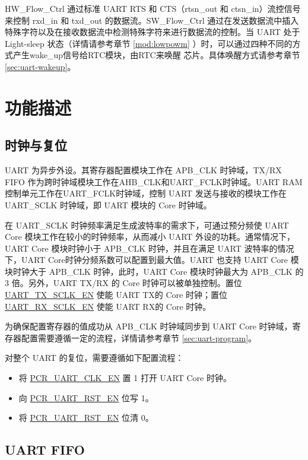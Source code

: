 \documentclass[main\_\_CN.tex]{subfiles}
\begin{document}
HW\_Flow\_Ctrl 通过标准 UART RTS 和 CTS（rtsn\_out 和 ctsn\_in）流控信号来控制 rxd\_in 和 txd\_out 的数据流。SW\_Flow\_Ctrl 通过在发送数据流中插入特殊字符以及在接收数据流中检测特殊字符来进行数据流的控制。当 UART 处于 Light-sleep 状态（详情请参考章节 \ref{mod:lowpowm} \textit{}）时，可以通过四种不同的方式产生wake\_up信号给RTC模块，由RTC来唤醒 \chipname{} 芯片。具体唤醒方式请参考章节 \ref{sec:uart-wakeup}。

\section{功能描述}

\subsection{时钟与复位}
UART 为异步外设。其寄存器配置模块工作在 APB\_CLK 时钟域，TX/RX FIFO 作为跨时钟域模块工作在AHB\_CLK和UART\_FCLK时钟域。UART RAM控制单元工作在UART\_FCLK时钟域，控制 UART 发送与接收的模块工作在 UART\_SCLK 时钟域，即 UART 模块的 Core 时钟域。

在 UART\_SCLK 时钟频率满足生成波特率的需求下，可通过预分频使 UART Core 模块工作在较小的时钟频率，从而减小 UART 外设的功耗。通常情况下，UART Core 模块时钟小于 APB\_CLK 时钟，并且在满足 UART 波特率的情况下，UART Core时钟分频系数可以配置到最大值。UART 也支持 UART Core 模块时钟大于 APB\_CLK 时钟，此时，UART Core 模块时钟最大为 APB\_CLK 的 3 倍。另外，UART TX/RX 的 Core 时钟可以被单独控制。置位 \hyperref[fielddesc:UARTTXSCLKEN]{UART\_TX\_SCLK\_EN} 使能 UART TX的 Core 时钟；置位 \hyperref[fielddesc:UARTRXSCLKEN]{UART\_RX\_SCLK\_EN} 使能 UART RX的 Core 时钟。


为确保配置寄存器的值成功从 APB\_CLK 时钟域同步到 UART Core 时钟域，寄存器配置需要遵循一定的流程，详情请参考章节 \ref{sec:uart-program}。

对整个 UART 的复位，需要遵循如下配置流程：
\begin{itemize}
    \item 将 \hyperref[fielddesc:PCRUART0CLKEN]{PCR\_UART\_CLK\_EN} 置 1 打开 UART Core 时钟。
    \item 向 \hyperref[fielddesc:PCRUART0RSTEN]{PCR\_UART\_RST\_EN} 位写 1。
    \item 将 \hyperref[fielddesc:PCRUART0RSTEN]{PCR\_UART\_RST\_EN} 位清 0。
\end{itemize}


\subsection{UART FIFO}
\end{document}
